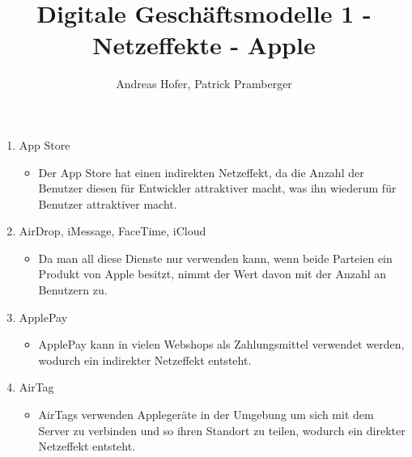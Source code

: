 \documentclass{article}
\title{\vspace{-1cm}Digitale Geschäftsmodelle 1 - Netzeffekte - Apple}
\author{Andreas Hofer, Patrick Pramberger}
\begin{document}
	\maketitle
	\begin{enumerate}
		\item{App Store}
		\begin{itemize}
			\item{Der App Store hat einen indirekten Netzeffekt, da die Anzahl der Benutzer diesen für Entwickler attraktiver macht, was ihn wiederum für Benutzer attraktiver macht.}
		\end{itemize}
		\item{AirDrop, iMessage, FaceTime, iCloud}
		\begin{itemize}
			\item{Da man all diese Dienste nur verwenden kann, wenn beide Parteien ein Produkt von Apple besitzt, nimmt der Wert davon mit der Anzahl an Benutzern zu.}
		\end{itemize}
		\item{ApplePay}
		\begin{itemize}
			\item{ApplePay kann in vielen Webshops als Zahlungsmittel verwendet werden, wodurch ein indirekter Netzeffekt entsteht.}
		\end{itemize}
		\item{AirTag}
		\begin{itemize}
			\item{AirTags verwenden Applegeräte in der Umgebung um sich mit dem Server zu verbinden und so ihren Standort zu teilen, wodurch ein direkter Netzeffekt entsteht.}
		\end{itemize}
	\end{enumerate}
	























  
\end{document}
